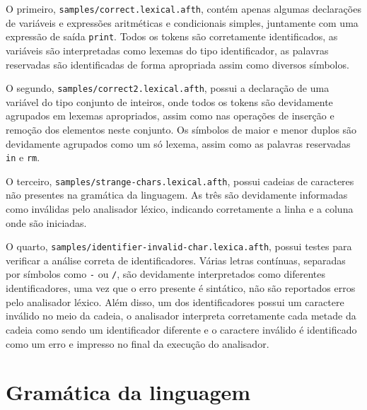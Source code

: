 \documentclass[
	article,			%
	11pt,				%
	oneside,			%
	a4paper,			%
	english,			%
	brazil,				%
	sumario=tradicional
	]{abntex2}
\begin{document}
O primeiro, \texttt{samples/correct.lexical.afth}, contém apenas
algumas declarações de variáveis e expressões aritméticas e condicionais
simples, juntamente com uma expressão de saída \texttt{print}.
Todos os tokens são corretamente identificados, as variáveis são
interpretadas como lexemas do tipo identificador, as palavras reservadas
são identificadas de forma apropriada assim como diversos símbolos.

O segundo, \texttt{samples/correct2.lexical.afth}, possui a declaração
de uma variável do tipo conjunto de inteiros, onde todos os tokens são
devidamente agrupados em lexemas apropriados, assim como nas operações
de inserção e remoção dos elementos neste conjunto. Os símbolos de
maior e menor duplos são devidamente agrupados como um só lexema, assim
como as palavras reservadas \texttt{in} e \texttt{rm}.

O terceiro, \texttt{samples/strange-chars.lexical.afth}, possui
cadeias de caracteres não presentes na gramática da linguagem. As três
são devidamente informadas como inválidas pelo analisador léxico,
indicando corretamente a linha e a coluna onde são iniciadas.

O quarto, \texttt{samples/identifier-invalid-char.lexica.afth}, possui
testes para verificar a análise correta de identificadores. Várias letras
contínuas, separadas por símbolos como \texttt{-} ou \texttt{/}, são
devidamente interpretados como diferentes identificadores, uma vez que
o erro presente é sintático, não são reportados erros pelo analisador léxico.
Além disso, um dos identificadores possui um caractere inválido no
meio da cadeia, o analisador interpreta corretamente cada metade da cadeia
como sendo um identificador diferente e o caractere inválido é identificado
como um erro e impresso no final da execução do analisador.

\section{Gramática da linguagem}


\setlength{\grammarparsep}{0pt plus 1pt minus 1pt} %
\setlength{\grammarindent}{12em} %
\end{document}
